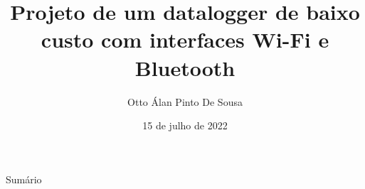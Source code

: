 \documentclass{libs/ufc_format}
\title[Projeto Datalogger]{\textbf{Projeto de um datalogger de baixo custo com interfaces Wi-Fi e Bluetooth}}
\author{Otto Álan Pinto De Sousa}
\institute[UFC]{
    \normalsize{\email{ottolopes20@gmail.com}}
    \newline
    \department{Departamento de Engenharia de Teleinformática}
    \newline
    \ufc
}
\date{15 de julho de 2022}
\begin{document}


\begin{frame}{}
    \maketitle
\end{frame}

\begin{frame}{Sumário}
    \begin{multicols}{2}
        \tableofcontents
    \end{multicols}
\end{frame}

% 

% 










\end{document}
